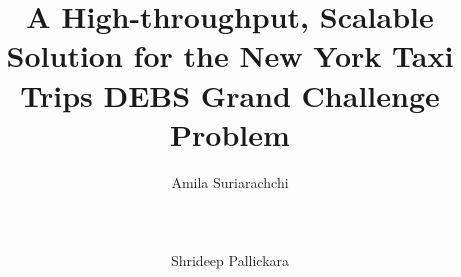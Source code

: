 \documentclass{acm_proc_article-sp}
\begin{document}
\title{A High-throughput, Scalable Solution for the New York Taxi Trips DEBS Grand Challenge Problem}
%
%
%
%
%

%
\author{
%
%
\alignauthor
Amila Suriarachchi\\
       \\
       \\
       \\
\alignauthor
Shrideep Pallickara\\
       \\
       \\
       \\
}
\end{document}
